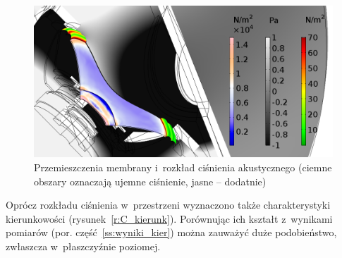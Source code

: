 \documentclass[12pt]{oska}
\begin{document}
	\begin{figure}[!ht]
		\centering
		\includegraphics[width=\textwidth]{stress_pressure_1kHz.png}
		\caption{Przemieszczenia membrany i~rozkład ciśnienia akustycznego (ciemne obszary oznaczają ujemne ciśnienie, jasne -- dodatnie)}
		\label{r:C_przem_cisn}
	\end{figure}
	
	Oprócz rozkładu ciśnienia w~przestrzeni wyznaczono także charakterystyki kierunkowości (rysunek~\ref{r:C_kierunk}). Porównując ich kształt z~wynikami pomiarów (por. część~\ref{ss:wyniki_kier}) można zauważyć duże podobieństwo, zwłaszcza w~płaszczyźnie poziomej.
	
\end{document}
